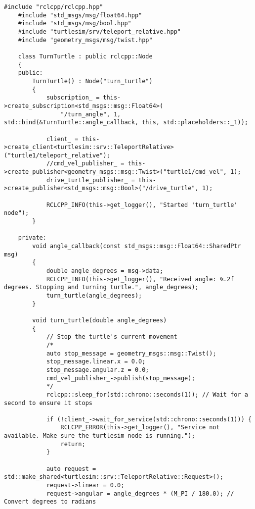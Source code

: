 \begin{lstlisting}[caption={\texttt{/turn\_turtle} source code}, label={lst:turn_turtle_source_code}]
    #include "rclcpp/rclcpp.hpp"
    #include "std_msgs/msg/float64.hpp"
    #include "std_msgs/msg/bool.hpp"
    #include "turtlesim/srv/teleport_relative.hpp"
    #include "geometry_msgs/msg/twist.hpp"
    
    class TurnTurtle : public rclcpp::Node
    {
    public:
        TurnTurtle() : Node("turn_turtle")
        {
            subscription_ = this->create_subscription<std_msgs::msg::Float64>(
                "/turn_angle", 1, std::bind(&TurnTurtle::angle_callback, this, std::placeholders::_1));
            
            client_ = this->create_client<turtlesim::srv::TeleportRelative>("turtle1/teleport_relative");
            //cmd_vel_publisher_ = this->create_publisher<geometry_msgs::msg::Twist>("turtle1/cmd_vel", 1);
            drive_turtle_publisher_ = this->create_publisher<std_msgs::msg::Bool>("/drive_turtle", 1);
    
            RCLCPP_INFO(this->get_logger(), "Started 'turn_turtle' node");
        }
    
    private:
        void angle_callback(const std_msgs::msg::Float64::SharedPtr msg)
        {
            double angle_degrees = msg->data;
            RCLCPP_INFO(this->get_logger(), "Received angle: %.2f degrees. Stopping and turning turtle.", angle_degrees);
            turn_turtle(angle_degrees);
        }
    
        void turn_turtle(double angle_degrees)
        {
            // Stop the turtle's current movement
            /*
            auto stop_message = geometry_msgs::msg::Twist();
            stop_message.linear.x = 0.0;
            stop_message.angular.z = 0.0;
            cmd_vel_publisher_->publish(stop_message);
            */
            rclcpp::sleep_for(std::chrono::seconds(1)); // Wait for a second to ensure it stops
    
            if (!client_->wait_for_service(std::chrono::seconds(1))) {
                RCLCPP_ERROR(this->get_logger(), "Service not available. Make sure the turtlesim node is running.");
                return;
            }
    
            auto request = std::make_shared<turtlesim::srv::TeleportRelative::Request>();
            request->linear = 0.0;
            request->angular = angle_degrees * (M_PI / 180.0); // Convert degrees to radians
    

\end{lstlisting}
